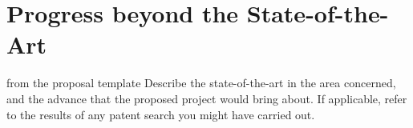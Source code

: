 \section{Progress beyond the State-of-the-Art}\label{sec:progress}
\begin{todo}{from the proposal template}
 Describe the state-of-the-art in the area concerned, and the advance that the proposed
  project would bring about. If applicable, refer to the results of any patent search you
  might have carried out.
\end{todo}

